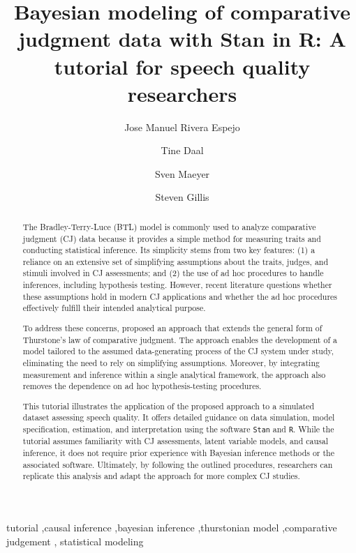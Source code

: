 \documentclass[
  authoryear,
  review,
  1p]{elsarticle}
\begin{document}
\begin{frontmatter}
\title{Bayesian modeling of comparative judgment data with Stan in R: A
tutorial for speech quality researchers}
\author[1]{Jose Manuel Rivera Espejo%
%
}
\author[1]{Tine Daal%
%
}
\author[1]{Sven Maeyer%
%
}
\author[2]{Steven Gillis%
%
}






        
\begin{abstract}
The Bradley-Terry-Luce (BTL) model is commonly used to analyze
comparative judgment (CJ) data because it provides a simple method for
measuring traits and conducting statistical inference. Its simplicity
stems from two key features: (1) a reliance on an extensive set of
simplifying assumptions about the traits, judges, and stimuli involved
in CJ assessments; and (2) the use of ad hoc procedures to handle
inferences, including hypothesis testing. However, recent literature
questions whether these assumptions hold in modern CJ applications and
whether the ad hoc procedures effectively fulfill their intended
analytical purpose.

To address these concerns, \citet{Rivera_et_al_2025} proposed an
approach that extends the general form of Thurstone's law of comparative
judgment. The approach enables the development of a model tailored to
the assumed data-generating process of the CJ system under study,
eliminating the need to rely on simplifying assumptions. Moreover, by
integrating measurement and inference within a single analytical
framework, the approach also removes the dependence on ad hoc
hypothesis-testing procedures.

This tutorial illustrates the application of the proposed approach to a
simulated dataset assessing speech quality. It offers detailed guidance
on data simulation, model specification, estimation, and interpretation
using the software \texttt{Stan} and \texttt{R}. While the tutorial
assumes familiarity with CJ assessments, latent variable models, and
causal inference, it does not require prior experience with Bayesian
inference methods or the associated software. Ultimately, by following
the outlined procedures, researchers can replicate this analysis and
adapt the approach for more complex CJ studies.
\end{abstract}





\begin{keyword}
    tutorial \sep causal inference \sep bayesian
inference \sep thurstonian model \sep comparative judgement \sep 
    statistical modeling
\end{keyword}
\end{frontmatter}
    
\end{document}
